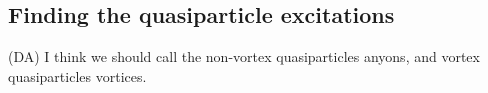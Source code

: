 \documentclass[12pt,a4paper]{article}
\newcounter{arrow}
\newcommand{\ra}{\rightarrow}
\newcommand{\mcz}{\mathcal{Z}}
\newcommand{\mcc}{\mathcal{C}}
\newcommand{\tube}{\textbf{Tube}}
\newcommand{\kw}[1]{{\color{kwcolor}\footnotesize{(KW) #1}}}
\newcommand{\dave}[1]{{\color{ao(english)}\footnotesize{(DA) #1}}}
\newcommand{\ethan}[1]{{\color{amethyst}\footnotesize{(EL) #1}}}
\begin{document}

\subsection{Finding the quasiparticle excitations}
\dave{I think we should call the non-vortex quasiparticles anyons, and vortex quasiparticles vortices. }
\end{document}
